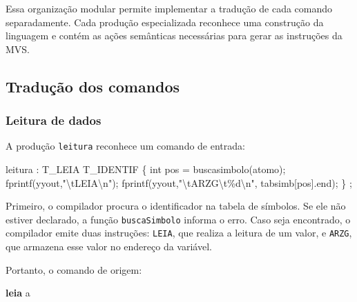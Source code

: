 \documentclass[
  brazilian,
  letterpaper,
]{book}
\newenvironment{Shaded}{\begin{snugshade}}{\end{snugshade}}
\newcommand{\DataTypeTok}[1]{\textcolor[rgb]{0.68,0.00,0.00}{#1}}
\newcommand{\KeywordTok}[1]{\textcolor[rgb]{0.00,0.23,0.31}{\textbf{#1}}}
\newcommand{\NormalTok}[1]{\textcolor[rgb]{0.00,0.23,0.31}{#1}}
\newcommand{\OperatorTok}[1]{\textcolor[rgb]{0.37,0.37,0.37}{#1}}
\newcommand{\SpecialCharTok}[1]{\textcolor[rgb]{0.37,0.37,0.37}{#1}}
\newcommand{\StringTok}[1]{\textcolor[rgb]{0.13,0.47,0.30}{#1}}
\theoremstyle{plain}
\theoremstyle{definition}
\theoremstyle{remark}
\begin{document}
Essa organização modular permite implementar a tradução de cada comando
separadamente. Cada produção especializada reconhece uma construção da
linguagem e contém as ações semânticas necessárias para gerar as
instruções da MVS.

\subsection{Tradução dos comandos}\label{traduuxe7uxe3o-dos-comandos}

\subsubsection{Leitura de dados}\label{leitura-de-dados}

A produção \texttt{leitura} reconhece um comando de entrada:

\begin{Shaded}
\begin{Highlighting}[]
\NormalTok{leitura}
    \OperatorTok{:}\NormalTok{ T\_LEIA T\_IDENTIF}
       \OperatorTok{\{}
        \DataTypeTok{int}\NormalTok{ pos }\OperatorTok{=}\NormalTok{ buscasimbolo}\OperatorTok{(}\NormalTok{atomo}\OperatorTok{);} 
\NormalTok{        fprintf}\OperatorTok{(}\NormalTok{yyout}\OperatorTok{,}\StringTok{"}\SpecialCharTok{\textbackslash{}t}\StringTok{LEIA}\SpecialCharTok{\textbackslash{}n}\StringTok{"}\OperatorTok{);}
\NormalTok{        fprintf}\OperatorTok{(}\NormalTok{yyout}\OperatorTok{,}\StringTok{"}\SpecialCharTok{\textbackslash{}t}\StringTok{ARZG}\SpecialCharTok{\textbackslash{}t\%d\textbackslash{}n}\StringTok{"}\OperatorTok{,}\NormalTok{ tabsimb}\OperatorTok{[}\NormalTok{pos}\OperatorTok{].}\NormalTok{end}\OperatorTok{);} 
       \OperatorTok{\}}
    \OperatorTok{;}
\end{Highlighting}
\end{Shaded}

Primeiro, o compilador procura o identificador na tabela de símbolos. Se
ele não estiver declarado, a função \texttt{buscaSimbolo} informa o
erro. Caso seja encontrado, o compilador emite duas instruções:
\texttt{LEIA}, que realiza a leitura de um valor, e \texttt{ARZG}, que
armazena esse valor no endereço da variável.

Portanto, o comando de origem:

\begin{Shaded}
\begin{Highlighting}[]
\KeywordTok{leia}\NormalTok{ a}
\end{Highlighting}
\end{Shaded}
\end{document}
